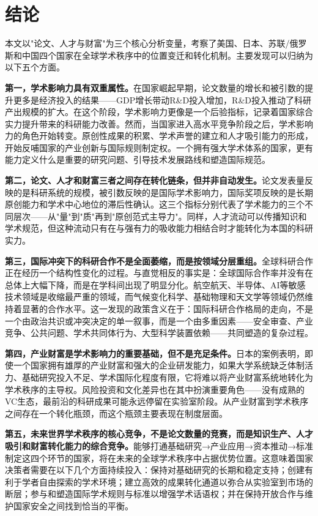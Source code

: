 \section{结论}

\noindent 本文以"论文、人才与财富"为三个核心分析变量，考察了美国、日本、苏联/俄罗斯和中国四个国家在全球学术秩序中的位置变迁和转化机制。主要发现可以归纳为以下五个方面。

\textbf{第一，学术影响力具有双重属性。}在国家崛起早期，论文数量的增长和被引数的提升更多是经济投入的结果——GDP增长带动R\&D投入增加，R\&D投入推动了科研产出规模的扩大。在这个阶段，学术影响力更像是一个后验指标，记录着国家综合实力提升带来的科研能力改善。然而，当国家进入高水平竞争阶段之后，学术影响力的角色开始转变。原创性成果的积累、学术声誉的建立和人才吸引能力的形成，开始反哺国家的产业创新与国际规则制定权。一个拥有强大学术体系的国家，更有能力定义什么是重要的研究问题、引导技术发展路线和塑造国际规范。

\textbf{第二，论文、人才和财富三者之间存在转化链条，但并非自动发生。}论文发表量反映的是科研系统的规模，被引数反映的是国际学术影响力，国际奖项反映的是长期原创能力和学术中心地位的滞后性确认。这三个指标分别代表了学术能力的三个不同层次——从"量"到"质"再到"原创范式主导力"。同样，人才流动可以传播知识和学术规范，但这种流动只有在与强有力的吸收能力相结合时才能转化为本国的科研实力。

\textbf{第三，国际冲突下的科研合作不是全面萎缩，而是按领域分层重组。}全球科研合作正在经历一个结构性变化的过程。与直觉相反的事实是：全球国际合作率并没有在总体上大幅下降，而是在学科间出现了明显分化。航空航天、半导体、AI等敏感技术领域是收缩最严重的领域，而气候变化科学、基础物理和天文学等领域仍然维持着显著的合作水平。这一发现的政策含义在于：国际科研合作格局的走向，不是一个由政治共识或冲突决定的单一叙事，而是一个由多重因素——安全审查、产业竞争、公共问题、学术共同体行为、大型科学装置依赖——共同塑造的复杂过程。

\textbf{第四，产业财富是学术影响力的重要基础，但不是充足条件。}日本的案例表明，即使一个国家拥有雄厚的产业财富和强大的企业研发能力，如果大学系统缺乏体制活力、基础研究投入不足、学术国际化程度有限，它将难以将产业财富系统地转化为学术秩序的主导权。风险投资和文化差异也在其中扮演重要角色——没有成熟的VC生态，最前沿的科研成果可能永远停留在实验室阶段。从产业财富到学术秩序之间存在一个转化瓶颈，而这个瓶颈主要表现在制度层面。

\textbf{第五，未来世界学术秩序的核心竞争，不是论文数量的竞赛，而是知识生产、人才吸引和财富转化能力的综合竞争。}能够打通基础研究→产业应用→资本推动→标准制定这四个环节的国家，将在未来的全球学术秩序中占据优势位置。这意味着国家决策者需要在以下几个方面持续投入：保持对基础研究的长期和稳定支持；创建有利于学者自由探索的学术环境；建立高效的成果转化通道以弥合从实验室到市场的断层；参与和塑造国际学术规则与标准以增强学术话语权；并在保持开放合作与维护国家安全之间找到恰当的平衡。

